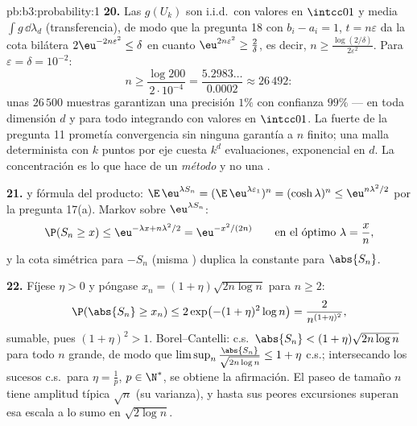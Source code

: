 \begin{solution}{pb:b3:probability:1}
\textbf{20.} Las $g(U_k)$ son i.i.d.\ con valores en $\intcc01$ y media
$\int g\,\dd\lambda_d$ (transferencia), de modo que la pregunta 18 con
$b_i - a_i = 1$, $t = n\varepsilon$ da la cota bilátera
$2\eu^{-2n\varepsilon^2} \leq \delta$ en cuanto
$\eu^{2n\varepsilon^2} \geq \frac2\delta$, es decir,
$n \geq \frac{\log(2/\delta)}{2\varepsilon^2}$. Para
$\varepsilon = \delta = 10^{-2}$:
\[
n \geq \frac{\log 200}{2\cdot10^{-4}} =
\frac{5.2983\ldots}{0.0002} \approx 26\,492 :
\]
unas $26\,500$ muestras garantizan una precisión $1\%$ con confianza
$99\%$ --- en toda dimensión $d$ y para todo integrando
 con valores en $\intcc01$.
La  fuerte de la pregunta 11
prometía convergencia sin ninguna garantía a $n$ finito; una malla
determinista con $k$ puntos por eje cuesta $k^d$ evaluaciones,
exponencial en $d$. La concentración es lo que hace de
 un \emph{método} y no
una .

\textbf{21.}  y
fórmula del producto:
$\E\,\eu^{\lambda S_n} = (\E\,\eu^{\lambda\varepsilon_1})^n
= (\cosh\lambda)^n \leq \eu^{n\lambda^2/2}$ por la pregunta 17(a).
Markov sobre $\eu^{\lambda S_n}$:
\[
\P(S_n \geq x) \leq \eu^{-\lambda x + n\lambda^2/2}
= \eu^{-x^2/(2n)}
\qquad\text{en el óptimo } \lambda = \frac xn,
\]
y la cota simétrica para $-S_n$ (misma
) duplica la constante para
$\abs{S_n}$.

\textbf{22.} Fíjese $\eta > 0$ y póngase $x_n = (1 +
\eta)\sqrt{2n\log n}$ para $n \geq 2$:
\[
\P(\abs{S_n} \geq x_n) \leq 2\exp\bigl(-(1 +
\eta)^2\log n\bigr) = \frac{2}{n^{(1+\eta)^2}},
\]
sumable, pues $(1 + \eta)^2 > 1$. Borel--Cantelli: c.s.\
$\abs{S_n} < (1 + \eta)\sqrt{2n\log n}$ para todo $n$ grande, de modo
que $\limsup_n\frac{\abs{S_n}}{\sqrt{2n\log n}} \leq 1 +
\eta$ c.s.; intersecando los sucesos c.s.\ para $\eta =
\frac1p$, $p \in \N^*$, se obtiene la afirmación. El paseo de tamaño $n$
tiene amplitud típica $\sqrt n$ (su varianza), y hasta sus peores
excursiones superan esa escala a lo sumo en
$\sqrt{2\log n}$.


\end{solution}
